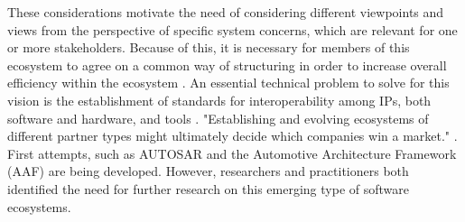 These considerations motivate the need of considering different viewpoints and views from the perspective of specific system concerns, which are relevant for one or more stakeholders. Because of this, it is necessary for members of this ecosystem to agree on a common way of structuring in order to increase overall efficiency within the ecosystem \cite{Patrizio2016AAF_Chalmers,Broy2009AAF_TUM,Broy:2006:CAS:1134285.1134292}. An essential technical problem to solve for this vision is the establishment of standards for interoperability among IPs, both software and hardware, and tools \cite{Broy:2006:CAS:1134285.1134292}. "Establishing and evolving ecosystems of different partner types might ultimately decide which companies win a market." \cite{Bosch2016Ecosystem}. First attempts, such as AUTOSAR \cite{acm2008autosar} and the Automotive Architecture Framework (AAF) \cite{Patrizio2016AAF_Chalmers,Broy2009AAF_TUM} are being developed. However, researchers and practitioners both identified the need for further research on this emerging type of software ecosystems.

